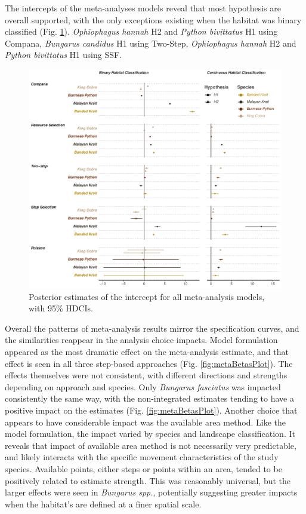 \documentclass[10pt,a4paper]{article}
\begin{document}
The intercepts of the meta-analyses models reveal that most hypothesis are overall supported, with the only exceptions existing when the habitat was binary classified (Fig. \ref{fig:metaInterPlot}).
\emph{Ophiophagus hannah} H2 and \emph{Python bivittatus} H1 using Compana, \emph{Bungarus candidus} H1 using Two-Step, \emph{Ophiophagus hannah} H2 and \emph{Python bivittatus} H1 using SSF.

\begin{figure}
\includegraphics[width=1\linewidth]{../../figures/metaIntercept} \caption{Posterior estimates of the intercept for all meta-analysis models, with 95\% HDCIs.}\label{fig:metaInterPlot}
\end{figure}

Overall the patterns of meta-analysis results mirror the specification curves, and the similarities reappear in the analysis choice impacts.
Model formulation appeared as the most dramatic effect on the meta-analysis estimate, and that effect is seen in all three step-based approaches (Fig. \ref{fig:metaBetasPlot}).
The effects themselves were not consistent, with different directions and strengths depending on approach and species.
Only \emph{Bungarus fasciatus} was impacted consistently the same way, with the non-integrated estimates tending to have a positive impact on the estimates (Fig. \ref{fig:metaBetasPlot}).
Another choice that appears to have considerable impact was the available area method.
Like the model formulation, the impact varied by species and landscape classification.
It reveals that impact of available area method is not necessarily very predictable, and likely interacts with the specific movement characteristics of the study species.
Available points, either steps or points within an area, tended to be positively related to estimate strength.
This was reasonably universal, but the larger effects were seen in \emph{Bungarus spp.}, potentially suggesting greater impacts when the habitat's are defined at a finer spatial scale.
\end{document}
